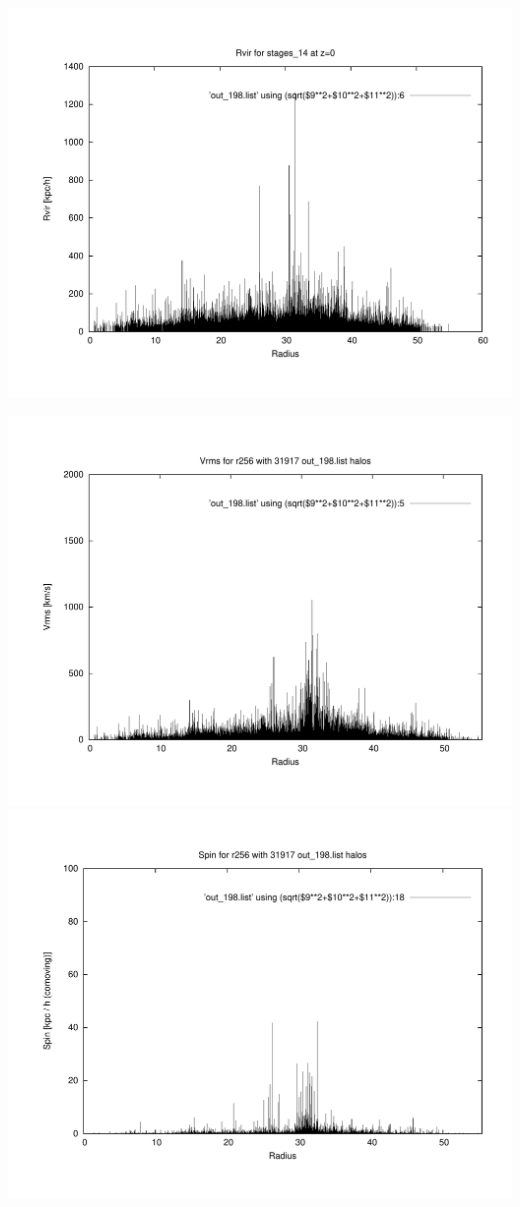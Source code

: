 \includegraphics[scale=0.3]{r256/stages_14/plot_rvir_z0.pdf}

\includegraphics[scale=0.3]{r256/stages_14/plot_Vrms_out_198.pdf}
\includegraphics[scale=0.3]{r256/stages_14/plot_spin_out_198.pdf}

